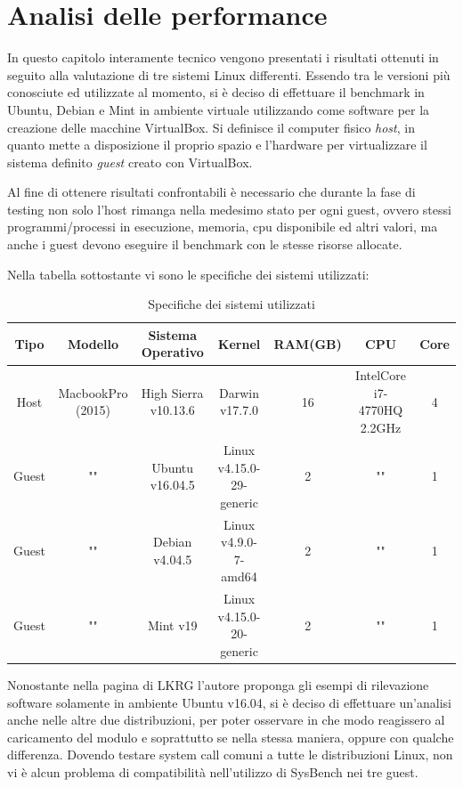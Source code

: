 \chapter{Analisi delle performance}

\label{Chapter4}

In questo capitolo interamente tecnico vengono presentati i risultati ottenuti in seguito alla valutazione di tre sistemi Linux differenti. Essendo tra le versioni più conosciute ed utilizzate al momento, si è deciso di effettuare il benchmark in Ubuntu, Debian e Mint in ambiente virtuale utilizzando come software per la creazione delle macchine VirtualBox. Si definisce il computer fisico \emph{host}, in quanto mette a disposizione il proprio spazio e l'hardware per virtualizzare il sistema definito \emph{guest} creato con VirtualBox.

Al fine di ottenere risultati confrontabili è necessario che durante la fase di testing non solo l'host rimanga nella medesimo stato per ogni guest, ovvero stessi programmi/processi in esecuzione, memoria, cpu disponibile ed altri valori, ma anche i guest devono eseguire il benchmark con le stesse risorse allocate.

Nella tabella sottostante vi sono le specifiche dei sistemi utilizzati:

\begin{table}[!htbp]
\label{tab:specs}
\centering
\begin{adjustbox}{width=\textwidth}
\begin{tabular}{|c|c|c|c|c|c|c|}
\hline
\textbf{Tipo} & \textbf{Modello} & \textbf{Sistema Operativo} & \textbf{Kernel} & \textbf{RAM(GB)} & \textbf{CPU} & \textbf{Core} \\
\hline
Host & MacbookPro (2015) & High Sierra v10.13.6 & Darwin v17.7.0 & 16 & IntelCore i7-4770HQ 2.2GHz & 4 \\
\hline
Guest & "" & Ubuntu v16.04.5 & Linux v4.15.0-29-generic &  2 & "" & 1 \\
\hline
Guest & "" & Debian v4.04.5 & Linux v4.9.0-7-amd64 &  2 & "" & 1 \\
\hline
Guest & "" & Mint v19 & Linux v4.15.0-20-generic &  2 & "" & 1 \\
\hline
\end{tabular}
\end{adjustbox}
\caption{Specifiche dei sistemi utilizzati}
\end{table}

Nonostante nella pagina di LKRG l'autore proponga gli esempi di rilevazione software solamente in ambiente Ubuntu v16.04, si è deciso di effettuare un'analisi anche nelle altre due distribuzioni, per poter osservare in che modo reagissero al caricamento del modulo e soprattutto se nella stessa maniera, oppure con qualche differenza. Dovendo testare system call comuni a tutte le distribuzioni Linux, non vi è alcun problema di compatibilità nell'utilizzo di SysBench nei tre guest.

